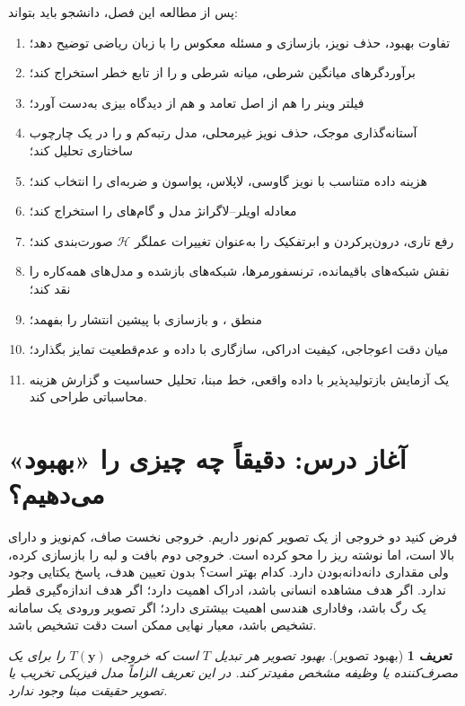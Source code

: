 \documentclass[12pt,openany,oneside]{book}
\newtheorem{definition}{تعریف}[chapter]
\newcommand{\vect}[1]{\bm{#1}}
\newcommand{\op}[1]{\mathcal{#1}}
\begin{document}
\begin{learningbox}
پس از مطالعه این فصل، دانشجو باید بتواند:
\begin{enumerate}
\item تفاوت بهبود، حذف نویز، بازسازی و مسئله معکوس را با زبان ریاضی توضیح دهد؛
\item برآوردگرهای میانگین شرطی، میانه شرطی و  را از تابع خطر استخراج کند؛
\item فیلتر وینر را هم از اصل تعامد و هم از دیدگاه بیزی به‌دست آورد؛
\item آستانه‌گذاری موجک، حذف نویز غیرمحلی، مدل رتبه‌کم و  را در یک چارچوب ساختاری تحلیل کند؛
\item هزینه داده متناسب با نویز گاوسی، لاپلاس، پواسون و ضربه‌ای را انتخاب کند؛
\item معادله اویلر--لاگرانژ مدل  و گام‌های  را استخراج کند؛
\item رفع تاری، درون‌پرکردن و ابرتفکیک را به‌عنوان تغییرات عملگر \(\op H\) صورت‌بندی کند؛
\item نقش شبکه‌های باقیمانده، ترنسفورمرها، شبکه‌های بازشده و مدل‌های همه‌کاره را نقد کند؛
\item منطق ،  و بازسازی با پیشین انتشار را بفهمد؛
\item میان دقت اعوجاجی، کیفیت ادراکی، سازگاری با داده و عدم‌قطعیت تمایز بگذارد؛
\item یک آزمایش بازتولیدپذیر با داده واقعی، خط مبنا، تحلیل حساسیت و گزارش هزینه محاسباتی طراحی کند.
\end{enumerate}
\end{learningbox}

\section{آغاز درس: دقیقاً چه چیزی را «بهبود» می‌دهیم؟}

فرض کنید دو خروجی از یک تصویر کم‌نور داریم. خروجی نخست صاف، کم‌نویز و دارای  بالا است، اما نوشته ریز را محو کرده است.
خروجی دوم بافت و لبه را بازسازی کرده، ولی مقداری دانه‌دانه‌بودن دارد. کدام بهتر است؟ بدون تعیین هدف، پاسخ یکتایی وجود ندارد.
اگر هدف مشاهده انسانی باشد، ادراک اهمیت دارد؛ اگر هدف اندازه‌گیری قطر یک رگ باشد، وفاداری هندسی اهمیت بیشتری دارد؛
اگر تصویر ورودی یک سامانه تشخیص باشد، معیار نهایی ممکن است دقت تشخیص باشد.

\begin{definition}[بهبود تصویر]
بهبود تصویر  هر تبدیل \(T\) است که خروجی \(T(\vect y)\) را برای یک مصرف‌کننده یا وظیفه مشخص
مفیدتر کند. در این تعریف الزاماً مدل فیزیکی تخریب یا تصویر حقیقت مبنا وجود ندارد.
\end{definition}
\end{document}
